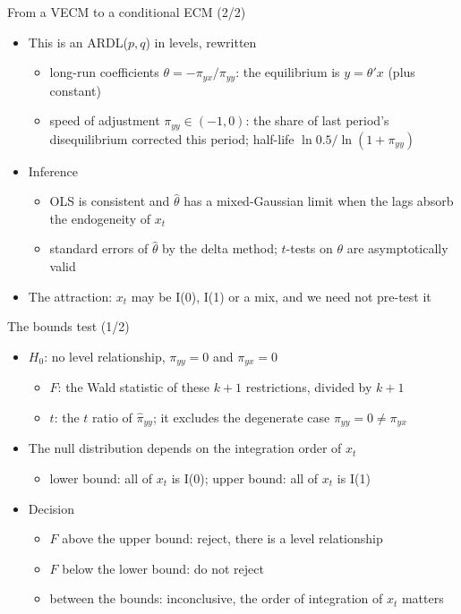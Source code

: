 \begin{frame}{From a VECM to a conditional ECM (2/2)}
\itemsize{\small}
\begin{itemize}
    \item This is an ARDL($p, q$) in levels, rewritten
    \begin{itemize}
        \item long-run coefficients $\theta = -\pi_{yx}/\pi_{yy}$: the equilibrium is $y = \theta'x$ (plus constant)
        \item speed of adjustment $\pi_{yy} \in (-1, 0)$: the share of last period's disequilibrium corrected this period; half-life $\ln 0.5/\ln(1 + \pi_{yy})$
    \end{itemize}
    \item Inference
    \begin{itemize}
        \item OLS is consistent and $\hat\theta$ has a mixed-Gaussian limit when the lags absorb the endogeneity of $x_t$ 
        \item standard errors of $\hat\theta$ by the delta method; $t$-tests on $\theta$ are asymptotically valid
    \end{itemize}
    \item The attraction: $x_t$ may be I(0), I(1) or a mix, and we need not pre-test it
\end{itemize}
\end{frame}

\begin{frame}{The bounds test (1/2)}
\itemsize{\small}
\begin{itemize}
    \item $H_0$: no level relationship, $\pi_{yy} = 0$ and $\pi_{yx} = 0$
    \begin{itemize}
        \item $F$: the Wald statistic of these $k + 1$ restrictions, divided by $k + 1$
        \item $t$: the $t$ ratio of $\hat\pi_{yy}$; it excludes the degenerate case $\pi_{yy} = 0 \ne \pi_{yx}$
    \end{itemize}
    \item The null distribution depends on the integration order of $x_t$
    \begin{itemize}
        \item lower bound: all of $x_t$ is I(0); upper bound: all of $x_t$ is I(1)
    \end{itemize}
    \item Decision
    \begin{itemize}
        \item $F$ above the upper bound: reject, there is a level relationship
        \item $F$ below the lower bound: do not reject
        \item between the bounds: inconclusive, the order of integration of $x_t$ matters
    \end{itemize}
\end{itemize}
\end{frame}

